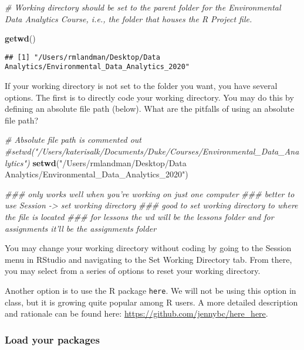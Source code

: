 \documentclass[]{article}
\newenvironment{Shaded}{\begin{snugshade}}{\end{snugshade}}
\newcommand{\CommentTok}[1]{\textcolor[rgb]{0.56,0.35,0.01}{\textit{#1}}}
\newcommand{\KeywordTok}[1]{\textcolor[rgb]{0.13,0.29,0.53}{\textbf{#1}}}
\newcommand{\NormalTok}[1]{#1}
\newcommand{\StringTok}[1]{\textcolor[rgb]{0.31,0.60,0.02}{#1}}
\begin{document}
\begin{Shaded}
\begin{Highlighting}[]
\CommentTok{# Working directory should be set to the parent folder for the Environmental Data Analytics Course, i.e., the folder that houses the R Project file.}

\KeywordTok{getwd}\NormalTok{()}
\end{Highlighting}
\end{Shaded}

\begin{verbatim}
## [1] "/Users/rmlandman/Desktop/Data Analytics/Environmental_Data_Analytics_2020"
\end{verbatim}

If your working directory is not set to the folder you want, you have
several options. The first is to directly code your working directory.
You may do this by defining an absolute file path (below). What are the
pitfalls of using an absolute file path?

\begin{Shaded}
\begin{Highlighting}[]
\CommentTok{# Absolute file path is commented out}
\CommentTok{#setwd("/Users/katerisalk/Documents/Duke/Courses/Environmental_Data_Analytics")}
\KeywordTok{setwd}\NormalTok{(}\StringTok{"/Users/rmlandman/Desktop/Data Analytics/Environmental_Data_Analytics_2020"}\NormalTok{)}

\CommentTok{### only works well when you're working on just one computer }
\CommentTok{### better to use Session -> set working directory }
\CommentTok{### good to set working directory to where the file is located }
  \CommentTok{### for lessons the wd will be the lessons folder and for assignments it'll be the assignments folder }
\end{Highlighting}
\end{Shaded}

You may change your working directory without coding by going to the
Session menu in RStudio and navigating to the Set Working Directory tab.
From there, you may select from a series of options to reset your
working directory.

Another option is to use the R package \texttt{here}. We will not be
using this option in class, but it is growing quite popular among R
users. A more detailed description and rationale can be found here:
\url{https://github.com/jennybc/here_here}.

\hypertarget{load-your-packages}{%
\subsubsection{Load your packages}\label{load-your-packages}}
\end{document}
